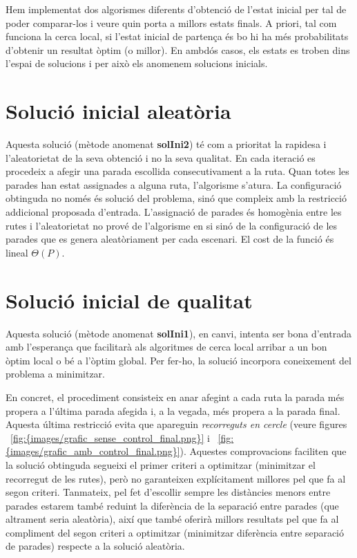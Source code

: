 
Hem implementat dos algorismes diferents d'obtenció de l'estat inicial per tal de poder comparar-los i veure quin porta a millors estats finals. A priori, tal com funciona la cerca local, si l'estat inicial de partença és bo hi ha més probabilitats d'obtenir un resultat òptim (o millor).  En ambdós casos, els estats es troben dins l'espai de solucions i per això els anomenem solucions inicials.

\section{Solució inicial aleatòria}

Aquesta solució (mètode anomenat \textbf{solIni2}) té com a prioritat la rapidesa i l'aleatorietat de la seva obtenció i no la seva qualitat. En cada iteració es procedeix a afegir una parada escollida consecutivament a la ruta. Quan totes les parades han estat assignades a alguna ruta, l'algorisme s'atura. La configuració obtinguda no només és solució del problema, sinó que compleix amb la restricció addicional proposada d'entrada. L'assignació de parades és homogènia entre les rutes i l'aleatorietat no prové de l'algorisme en si sinó de la configuració de les parades que es genera aleatòriament per cada escenari. El cost de la funció és lineal $\Theta(P)$.

\section{Solució inicial de qualitat}

Aquesta solució (mètode anomenat \textbf{solIni1}), en canvi, intenta ser bona d'entrada amb l'esperança que facilitarà als algoritmes de cerca local arribar a un bon òptim local o bé a l'òptim global. Per fer-ho, la solució incorpora coneixement del problema a minimitzar. 

En concret, el procediment consisteix en anar afegint a cada ruta la parada més propera a l'última parada afegida i, a la vegada, més propera a la parada final. Aquesta última restricció evita que apareguin \emph{recorreguts en cercle} (veure figures ~\ref{fig:{images/grafic_sense_control_final.png}} i ~\ref{fig:{images/grafic_amb_control_final.png}}). Aquestes comprovacions faciliten que la solució obtinguda segueixi el primer criteri a optimitzar (minimitzar el recorregut de les rutes), però no garanteixen explícitament millores pel que fa al segon criteri. Tanmateix, pel fet d'escollir sempre les distàncies menors entre parades estarem també reduint la diferència de la separació entre parades (que altrament seria aleatòria), així que també oferirà millors resultats pel que fa al compliment del segon criteri a optimitzar (minimitzar diferència entre separació de parades) respecte a la solució aleatòria.


